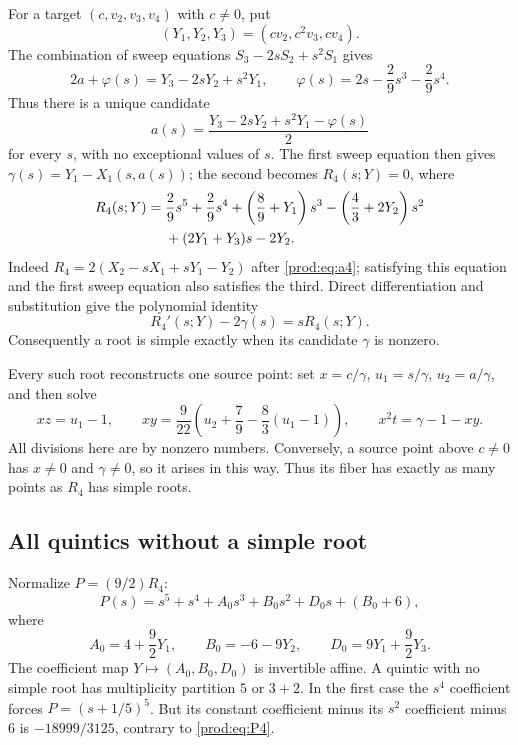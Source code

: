\documentclass[11pt]{article}
\numberwithin{equation}{section}
\theoremstyle{plain}
\theoremstyle{definition}
\theoremstyle{remark}
\begin{document}
For a target $(c,v_2,v_3,v_4)$ with $c\ne0$, put
\[
 (Y_1,Y_2,Y_3)=(cv_2,c^2v_3,cv_4).
\]
The combination of sweep equations $S_3-2sS_2+s^2S_1$ gives
\[
 2a+\varphi(s)=Y_3-2sY_2+s^2Y_1,
 \qquad \varphi(s)=2s-\frac29s^3-\frac29s^4.
\]
Thus there is a unique candidate
\begin{equation}\label{prod:eq:a4}
 a(s)=\frac{Y_3-2sY_2+s^2Y_1-\varphi(s)}2
\end{equation}
for every $s$, with no exceptional values of $s$. The first sweep equation
then gives $\gamma(s)=Y_1-X_1(s,a(s))$; the second becomes $R_4(s;Y)=0$, where
\begin{align}
 R_4(s;Y)={}&\frac29s^5+\frac29s^4+
 \left(\frac89+Y_1\right)s^3
 -\left(\frac43+2Y_2\right)s^2\notag\\
 &+(2Y_1+Y_3)s-2Y_2.\label{prod:eq:R4}
\end{align}
Indeed $R_4=2(X_2-sX_1+sY_1-Y_2)$ after \eqref{prod:eq:a4}; satisfying
this equation and the first sweep equation also satisfies the third.
Direct differentiation and substitution give the polynomial identity
\begin{equation}\label{prod:eq:deriv4}
 R_4'(s;Y)-2\gamma(s)=sR_4(s;Y).
\end{equation}
Consequently a root is simple exactly when its candidate $\gamma$ is nonzero.

Every such root reconstructs one source point: set $x=c/\gamma$,
$u_1=s/\gamma$, $u_2=a/\gamma$, and then solve
\[
 xz=u_1-1,\qquad
 xy=\frac9{22}\left(u_2+\frac79-\frac83(u_1-1)\right),
 \qquad x^2t=\gamma-1-xy.
\]
All divisions here are by nonzero numbers. Conversely, a source point above
$c\ne0$ has $x\ne0$ and $\gamma\ne0$, so it arises in this way.
Thus its fiber has exactly as many points as $R_4$ has simple roots.

\subsection{All quintics without a simple root}
Normalize $P=(9/2)R_4$:
\begin{equation}\label{prod:eq:P4}
 P(s)=s^5+s^4+A_0s^3+B_0s^2+D_0s+(B_0+6),
\end{equation}
where
\[
 A_0=4+\frac92Y_1,\qquad B_0=-6-9Y_2,\qquad
 D_0=9Y_1+\frac92Y_3.
\]
The coefficient map $Y\mapsto(A_0,B_0,D_0)$ is invertible affine.
A quintic with no simple root has multiplicity partition $5$ or $3+2$.
In the first case the $s^4$ coefficient forces
$P=(s+1/5)^5$. But its constant coefficient minus its $s^2$ coefficient
minus $6$ is $-18999/3125$, contrary to \eqref{prod:eq:P4}.
\end{document}

